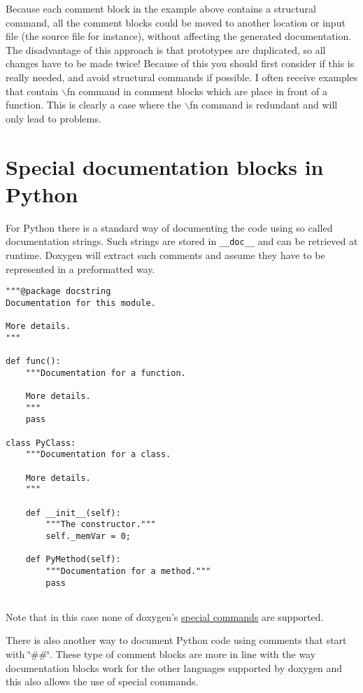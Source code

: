 Because each comment block in the example above contains a structural command, all the comment blocks could be moved to another location or input file (the source file for instance), without affecting the generated documentation. The disadvantage of this approach is that prototypes are duplicated, so all changes have to be made twice! Because of this you should first consider if this is really needed, and avoid structural commands if possible. I often receive examples that contain $\backslash$fn command in comment blocks which are place in front of a function. This is clearly a case where the $\backslash$fn command is redundant and will only lead to problems.\hypertarget{docblocks_pythonblocks}{}\section{Special documentation blocks in Python}\label{docblocks_pythonblocks}
For Python there is a standard way of documenting the code using so called documentation strings. Such strings are stored in {\tt \_\-\_\-doc\_\-\_\-} and can be retrieved at runtime. Doxygen will extract such comments and assume they have to be represented in a preformatted way.



\begin{DocInclude}\begin{verbatim}"""@package docstring
Documentation for this module.

More details.
"""

def func():
    """Documentation for a function.

    More details.
    """
    pass

class PyClass:
    """Documentation for a class.

    More details.
    """
   
    def __init__(self):
        """The constructor."""
        self._memVar = 0;
   
    def PyMethod(self):
        """Documentation for a method."""
        pass
     
\end{verbatim}
\end{DocInclude}
 

Note that in this case none of doxygen's \hyperlink{commands_cmd_intro}{special commands} are supported.

There is also another way to document Python code using comments that start with \char`\"{}\#\#\char`\"{}. These type of comment blocks are more in line with the way documentation blocks work for the other languages supported by doxygen and this also allows the use of special commands.

